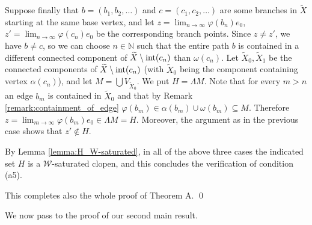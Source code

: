 \documentclass[12pt, a4paper]{article}
\newcommand{\NN}{\mathbb{N}} \newcommand{\ZZ}{\mathbb{Z}}
\newcommand{\8}{\infty}
\theoremstyle{break}
\newtheorem{thm}{Theorem}[section]
\theoremstyle{defbreak}
\newcommand{\wtl}[1]{\widetilde{#1}}
\newcounter{todocounter}
\newcommand{\todo}{\textcolor{red}{\textbf{TODO \thetodocounter} \addtocounter{todocounter}{1}}}
\begin{document}
\begin{itemize}
        Suppose finally that $b = (b_1, b_2, \ldots)$ and $c = (c_1, c_2, \ldots)$ are some branches in $\wtl{X}$ starting at the same base vertex, and let $z = \lim_{n\to \8} \varphi(b_n)e_0$, $z' = \lim_{n\to \8} \varphi(c_n)e_0$ be the corresponding branch points. Since $z\neq z'$, we have $b\neq c$, so we can choose $n\in \NN$ such that the entire path $b$ is contained in a  different connected component of $\wtl{X}\setminus\hbox{int}(c_n)$ than $\omega(c_n)$. Let $\wtl{X}_0, \wtl{X}_1$ be the connected components of $\wtl{X}\setminus\hbox{int}(c_n)$ (with $\wtl{X}_0$ being the component containing vertex $\alpha(c_n)$), and let $M=\bigcup V_{\wtl{X}_0}$. We put $H = \Lambda M$. Note that for every $m>n$ an edge $b_m$ is contained in $\wtl{X}_0$ and that by Remark \ref{remark:containment_of_edge} $\varphi(b_m)\in \alpha(b_m)\cup \omega(b_m)\subseteq M$. Therefore $z = \lim_{m\to\8}\varphi(b_m)e_0 \in \Lambda M = H$. Moreover, the argument as in the previous case shows that $z'\not\in H$.

        By Lemma \ref{lemma:H_W-saturated}, in all of the above three cases the indicated set $H$ is a $\mathcal{W}$-saturated clopen, and this concludes the verification of condition (a5).
    \end{itemize}

This completes also the whole proof of Theorem A. \qed



We now pass to the proof of our second main result.\medskip



\end{document}
